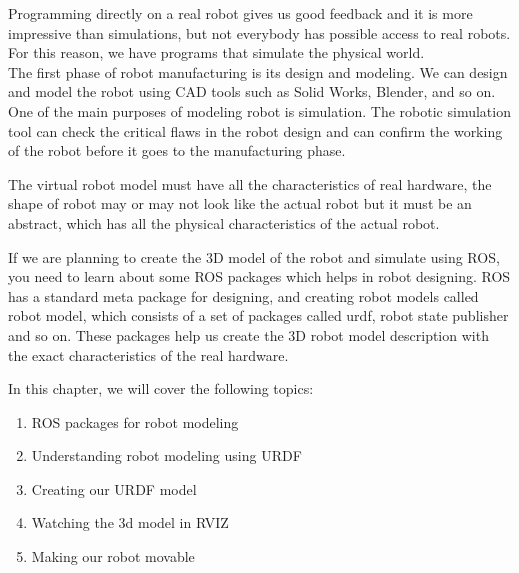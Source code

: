 Programming directly on a real robot gives us good feedback and it is more impressive
than simulations, but not everybody has possible access to real robots. For this reason,
we have programs that simulate the physical world.\\
The first phase of robot manufacturing is its design and modeling. We can design and model the 
robot using CAD tools such as Solid Works, Blender, and so on. One of the main purposes 
of modeling robot is simulation. The robotic simulation tool can check the critical flaws in the robot design and can confirm the 
working of the robot before it goes to the manufacturing phase.

The virtual robot model must have all the characteristics of real hardware, the shape of robot 
may or may not look like the actual robot but it must be an abstract, which has all the physical 
characteristics of the actual robot. 

If we are planning to create the 3D model of the robot and simulate using ROS, you need to learn about some ROS packages which helps in robot designing. ROS has a standard meta package for designing, and creating robot models called robot model, which consists of a set of packages called urdf, robot state publisher and so on.  These packages help us create the 3D robot model description with the exact characteristics of the 
real hardware.

In this chapter, we will cover the following topics:
\begin{enumerate}
\item ROS packages for robot modeling
\item  Understanding robot modeling using URDF
\item  Creating our URDF model
\item  Watching the 3d model in RVIZ
\item  Making our robot movable
\end{enumerate}

